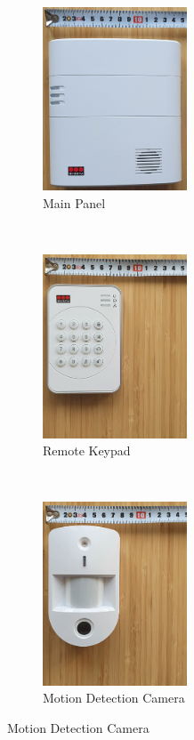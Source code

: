 \begin{figure}[!ht]
    \centering
    \begin{subfigure}[t]{0.33\textwidth}
        \includegraphics[height=2.15in]{images/main-panel.png}
        \caption{Main Panel}
        \label{fig:main-panel}
    \end{subfigure}%
    ~
    \begin{subfigure}[t]{0.33\textwidth}
        \includegraphics[height=2.15in]{images/keypad.png}
        \caption{Remote Keypad}
        \label{fig:remote-keypad}
    \end{subfigure}%
    ~
    \begin{subfigure}[t]{0.33\textwidth}
        \includegraphics[height=2.15in]{images/camera.png}
        \caption{Motion Detection Camera}
        \label{fig:motion-camera}
    \end{subfigure}
    

\end{figure}
